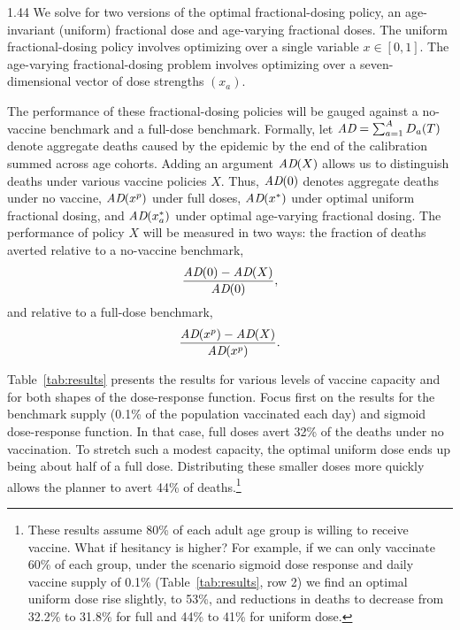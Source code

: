 \documentclass[12pt]{article}
\newcommand{\xpeak}{x^{p}}
\newcommand{\alldeaths}{\text{\it AD}}
\begin{document}
\begin{spacing}{1.44}
We solve for two versions of the optimal fractional-dosing policy, an
age-invariant (uniform) fractional dose and age-varying fractional
doses. The uniform fractional-dosing policy involves optimizing over a
single variable $x \in [0,1]$. The age-varying fractional-dosing
problem involves optimizing over a seven-dimensional vector of dose
strengths $(x_a)$.

The performance of these fractional-dosing policies will be gauged
against a no-vaccine benchmark and a full-dose benchmark. Formally,
let $\alldeaths = \sum_{a=1}^A D_a(T)$ denote aggregate deaths caused
by the epidemic by the end of the calibration summed across age
cohorts. Adding an argument $\alldeaths(X)$ allows us to distinguish
deaths under various vaccine policies $X$. Thus, $\alldeaths(0)$
denotes aggregate deaths under no vaccine, $\alldeaths(\xpeak)$ under
full doses, $\alldeaths(x^*)$ under optimal uniform fractional dosing,
and $\alldeaths(x_a^*)$ under optimal age-varying fractional
dosing. The performance of policy $X$ will be measured in two ways:
the fraction of deaths averted relative to a no-vaccine benchmark,
\begin{equation} 
\label{performance_no_vaccine}
\frac{\alldeaths(0) - \alldeaths(X)}{\alldeaths(0)},
\end{equation}
and relative to a full-dose benchmark,
\begin{equation}
\label{performance_full_dose}
\frac{\alldeaths(\xpeak) - \alldeaths(X)}{\alldeaths(\xpeak)}.
\end{equation} 

Table~\ref{tab:results} presents the results for various levels of
vaccine capacity and for both shapes of the dose-response
function. Focus first on the results for the benchmark supply (0.1\%
of the population vaccinated each day) and sigmoid dose-response
function. In that case, full doses avert 32\% of the deaths under no
vaccination. To stretch such a modest capacity, the optimal uniform
dose ends up being about half of a full dose. Distributing these
smaller doses more quickly allows the planner to avert 44\% of
deaths.\footnote{These results assume 80\% of each
adult age group is willing to receive vaccine. What if hesitancy is
higher? For example, if we can only vaccinate 60\% of each group, 
under the scenario sigmoid dose response and daily vaccine supply of 0.1\%
(Table~\ref{tab:results}, row 2) 
we find an optimal uniform dose rise slightly, to 53\%, and reductions in 
deaths to decrease from 32.2\% to 31.8\% for full and 44\% to 41\% for 
uniform dose.}


\end{spacing}
\end{document}
